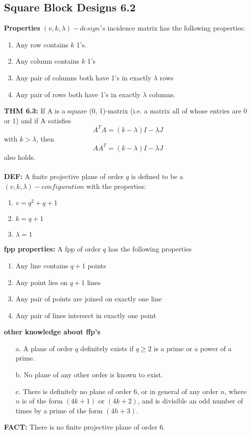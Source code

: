 \documentclass[12pt]{article}
\begin{document}
	\subsection{Square Block Designs 6.2}
	\textbf{Properties} $ (v,k,\lambda)-design's $ incidence matrix has the following properties: 
	\begin{enumerate}
		\item Any row contains $ k $ 1's.
		\item Any column contains $ k $ 1's
		\item Any pair of columns both have 1's in exactly $ \lambda $ rows
		\item Any pair of rows both have 1's in exactly $ \lambda $ columns.\\
	\end{enumerate}
	\textbf{THM 6.3: } If A is a square (0, 1)-matrix (i.e. a matrix all of whose	entries are 0 or 1) and if A satisfies 
	\[
		A^TA = (k-\lambda)I - \lambda J
	\] 
	with $ k > \lambda$, then 
	\[
		AA^T = (k-\lambda)I - \lambda J
	\] 
	also holds. \\\\
	\textbf{DEF: } A finite projective plane of order $ q $ is defined to be a $ (v,k,\lambda)-configuration $ with the properties: 
	\begin{enumerate}
		\item $ v = q^2 + q  + 1 $
		\item $ k = q + 1 $
		\item $ \lambda = 1  $
	\end{enumerate}
	\textbf{fpp properties: } A fpp of order $ q $ has the following properties
	\begin{enumerate}
		\item Any line contains $ q + 1 $ points
		\item Any point lies on $  q+1 $ lines
		\item Any pair of points are joined on exactly one line
		\item Any pair of lines intersect in exactly one point
	\end{enumerate}
	\textbf{other knowledge about ffp's}
	\begin{enumerate}
		\item[a.] A plane of order $ q $ definitely exists if $ q\geq 2 $ is a prime or a power	of a prime.
		\item[b.] No plane of any other order is known to exist.
		\item[c.] There is definitely no plane of order 6, or in general of any order
		$ n $, where $ n $ is of the form $ (4k + 1) $ or $ (4k + 2) $, and is divisible an odd	number of times by a prime of the form $ (4h + 3) $.
	\end{enumerate}
	\textbf{FACT:} There is no finite projective plane of order 6.
\end{document}
